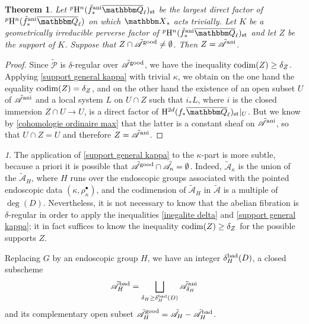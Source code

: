 \documentclass[12pt,english]{smfart}
\numberwithin{equation}{subsection}
\newtheorem{theoreme}[equation]{Theorem}
\theoremstyle{remark}
\newtheorem{numero}[equation]{}
\newcommand\calA{{\mathscr A}}
\newcommand\calP{{\mathscr P}}
\newcommand\QQ{{\mathbbm Q}}
\newcommand\rmH{{\rm H}}
\newcommand\bbX{{\mathbbm X}}
\newcommand\ani{{\rm ani}}
\newcommand\Ql{{\overline\QQ_\ell}}
\begin{document}
\begin{theoreme}\label{support stable}
Let ${}^p\rmH^n(\tilde f^\ani_*\Ql)_{\rm st}$ be the largest direct factor of ${}^p\rmH^n(\tilde f^\ani_*\Ql)$ on which $\bbX_*$ acts trivially. Let $K$ be a geometrically irreducible perverse factor of ${}^p\rmH^n(\tilde f^\ani_*\Ql)_{\rm st}$ and let $Z$ be the support of $K$. Suppose that $Z\cap\tilde\calA^{\rm good}\not=\emptyset$. Then $Z=\tilde\calA^\ani$.
\end{theoreme}

\begin{proof}
Since $\tilde\calP$ is $\delta$-regular over $\tilde\calA^{\rm good}$, we have the inequality ${\rm codim}(Z)\geq \delta_Z$. Applying \ref{support general kappa} with trivial $\kappa$, we obtain on the one hand the equality ${\rm codim}(Z)=\delta_Z$, and on the other hand the existence of an open subset $U$ of $\tilde\calA^\ani$ and a local system $L$ on $U\cap Z$ such that $i_*L$, where $i$ is the closed immersion $Z\cap U\rightarrow U$, is a direct factor of $\rmH^{2d}(f_*\Ql)_{\rm st}|_U$. But we know by \ref{cohomologie ordinaire max} that the latter is a constant sheaf on $\tilde\calA^\ani$, so that $U\cap Z=U$ and therefore $Z=\tilde\calA^\ani$.
\end{proof}

\begin{numero}\label{delta bad H}
The application of \ref{support general kappa} to the $\kappa$-part is more subtle, because a priori it is possible that $\tilde\calA^{\rm good}\cap\tilde\calA_\kappa=\emptyset$. Indeed, $\tilde\calA_\kappa$ is the union of the $\tilde\calA_H$, where $H$ runs over the endoscopic groups associated with the pointed endoscopic data $(\kappa,\rho_\kappa^\bullet)$, and the codimension of $\tilde\calA_H$ in $\tilde\calA$ is a multiple of $\deg(D)$. Nevertheless, it is not necessary to know that the abelian fibration is $\delta$-regular in order to apply the inequalities \ref{inegalite delta} and \ref{support general kappa}; it in fact suffices to know the inequality ${\rm codim}(Z)\geq \delta_Z$ for the possible supports $Z$.

Replacing $G$ by an endoscopic group $H$, we have an integer $\delta_H^{\rm bad}(D)$, a closed subscheme
$$\tilde\calA_H^{\rm bad}=\bigsqcup_{\delta_H\geq \delta_H^{\rm bad}(D)}\tilde\calA^\ani_{\delta_H}$$
and its complementary open subset $\tilde\calA_H^{\rm good}=\tilde\calA_H-\tilde\calA_H^{\rm bad}$.
\end{numero}
\end{document}
